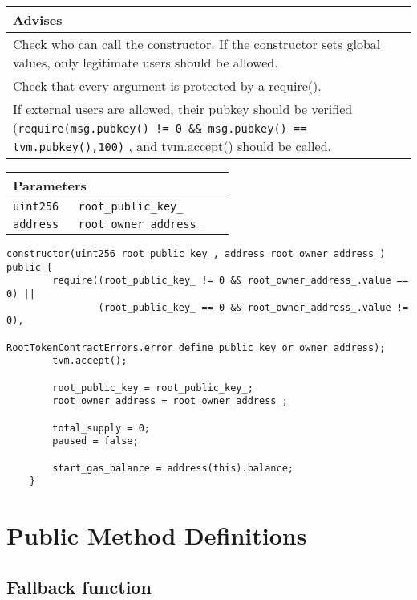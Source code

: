 \ifsoldraft
\noindent\begin{tabular}{|p{12cm}|}\hline
\rowcolor{green}Advises
\\\hline
Check who can call the constructor. If the constructor sets global values, only legitimate users should be allowed.
\\\hline
Check that every argument is protected by a require().
\\\hline
If external users are allowed, their pubkey should be verified (\verb+require(msg.pubkey() != 0 && msg.pubkey() == tvm.pubkey(),100)+ , and tvm.accept() should be called.
\\\hline\end{tabular}
\fi

\ifsoltables
\noindent\begin{tabular}{|l|l|p{5cm}|}\hline
\multicolumn{3}{|l|}{\bf Parameters}\\\hline
\tt uint256 & \tt root\_{}public\_{}key\_{} &\\\hline
\tt address & \tt root\_{}owner\_{}address\_{} &\\\hline
\end{tabular}
\fi

\vspace{2cm}

\begin{lstlisting}[firstnumber=48]
    constructor(uint256 root_public_key_, address root_owner_address_) public {
        require((root_public_key_ != 0 && root_owner_address_.value == 0) ||
                (root_public_key_ == 0 && root_owner_address_.value != 0),
                RootTokenContractErrors.error_define_public_key_or_owner_address);
        tvm.accept();

        root_public_key = root_public_key_;
        root_owner_address = root_owner_address_;

        total_supply = 0;
        paused = false;

        start_gas_balance = address(this).balance;
    }
\end{lstlisting}

\section{Public Method Definitions}


\subsection{Fallback function}

